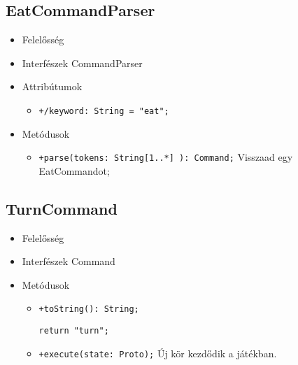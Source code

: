 \subsection{EatCommandParser}
\begin{itemize}
\item Felelősség\newline
\item Interfészek\newline
CommandParser
\item Attribútumok
	\begin{itemize}
		\item \texttt{+/keyword: String = "eat";}
	\end{itemize}
\item Metódusok
\begin{itemize}
		\item \texttt{+parse(tokens: String[1..*] ): Command;} \newline
		Visszaad egy EatCommandot;
	\end{itemize}
\end{itemize}

\subsection{TurnCommand}
\begin{itemize}
\item Felelősség\newline
\item Interfészek\newline
Command
\item Metódusok
\begin{itemize}
		\item \texttt{+toString(): String;}
		\begin{lstlisting}
return "turn";
		\end{lstlisting}
		\item \texttt{+execute(state: Proto);} \newline
		Új kör kezdődik a játékban.
	\end{itemize}
\end{itemize}
